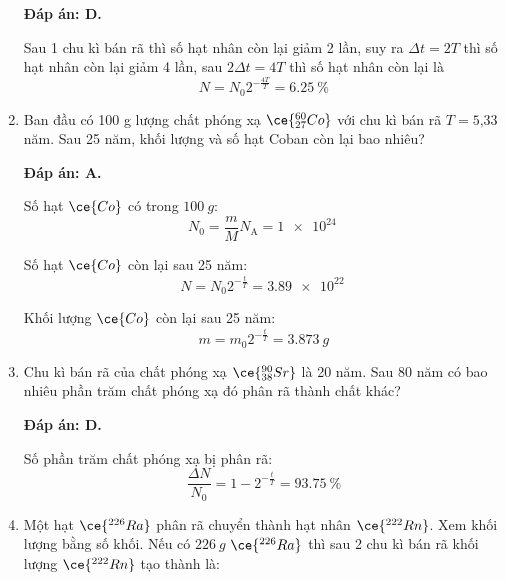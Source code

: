 \begin{enumerate}[label=\bfseries Câu \arabic*:]
	\loigiai
	{		\textbf{Đáp án: D.}
		
		Sau 1 chu kì bán rã thì số hạt nhân còn lại giảm 2 lần, suy ra $\Delta t = 2T$ thì số hạt nhân còn lại giảm 4 lần, sau $2\Delta t = 4T$ thì số hạt nhân còn lại là
		$$N=N_0 2^{-\frac{4T}{T}} = \SI{6.25}{\percent}$$
		
	}
	\item {}
	\cauhoi
	{Ban đầu có 100 g lượng chất phóng xạ $\ce{^{60}_{27} Co}$ với chu kì bán rã $T=\text{5,33}$ năm. Sau 25 năm, khối lượng và số hạt Coban còn lại bao nhiêu?
	}
	
	\loigiai
	{		\textbf{Đáp án: A.}
		
		Số hạt $\ce{Co}$ có trong $\SI{100}{g}$:
		$$N_0 = \dfrac{m}{M} N_\text{A} = \SI{1e24}{}$$
		
		Số hạt $\ce{Co}$ còn lại sau 25 năm:
		$$N=N_0 2^{-\frac{t}{T}} = \SI{3.89e22}{}$$
		
		Khối lượng $\ce{Co}$ còn lại sau 25 năm:
		$$m=m_0 2^{-\frac{t}{T}} = \SI{3,873}{g}$$
		
	}\item {}
\cauhoi
{Chu kì bán rã của chất phóng xạ $\ce{^{90}_{38} Sr}$ là 20 năm. Sau 80 năm có bao nhiêu phần trăm chất phóng xạ đó phân rã thành chất khác?
}

\loigiai
{		\textbf{Đáp án: D.}

Số phần trăm chất phóng xạ bị phân rã:
$$\dfrac{\Delta N}{N_0} = 1-2^{-\frac{t}{T}} = \SI{93.75}{\percent}$$

}

\item {}
\cauhoi
{Một hạt $\ce{^{226} Ra}$ phân rã chuyển thành hạt nhân $\ce{^{222} Rn}$. Xem khối lượng bằng số khối. Nếu có $\SI{226}{g}$ $\ce{^{226} Ra}$ thì sau 2 chu kì bán rã khối lượng $\ce{^{222} Rn}$ tạo thành là:
}


\end{enumerate}
